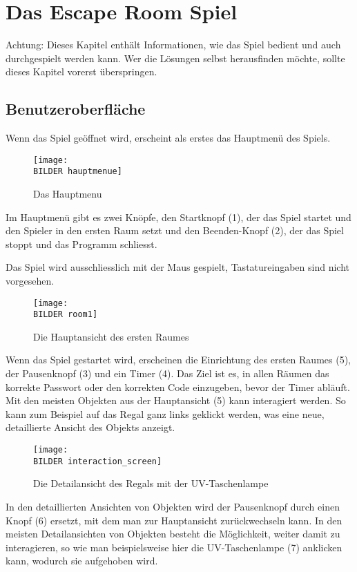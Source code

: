 \section{Das Escape Room Spiel}

Achtung: Dieses Kapitel enthält Informationen, wie das Spiel bedient und auch durchgespielt werden kann. Wer die Lösungen selbst herausfinden möchte, sollte dieses Kapitel vorerst überspringen.

\subsection{Benutzeroberfläche}
Wenn das Spiel geöffnet wird, erscheint als erstes das Hauptmenü des Spiels.

\begin{figure}[htb]
	\centering
		\texttt{[image: \\BILDER hauptmenue]}
 	\caption{Das Hauptmenu}
  \label{fig:hauptmenu}
\end{figure}

 
Im Hauptmenü gibt es zwei Knöpfe, den Startknopf (1), der das Spiel startet und den Spieler in den ersten Raum setzt und den Beenden-Knopf (2), der das Spiel stoppt und das Programm schliesst.

Das Spiel wird ausschliesslich mit der Maus gespielt, Tastatureingaben sind nicht vorgesehen. \newpage

\begin{figure}[h!]
	\centering
		\texttt{[image: \\BILDER room1]}
 	\caption{Die Hauptansicht des ersten Raumes}
  \label{fig:hauptansicht}
\end{figure}

Wenn das Spiel gestartet wird, erscheinen die Einrichtung des ersten Raumes (5), der Pausenknopf (3) und ein Timer (4). Das Ziel ist es, in allen Räumen das korrekte Passwort oder den korrekten Code einzugeben, bevor der Timer abläuft. Mit den meisten Objekten aus der Hauptansicht (5) kann interagiert werden. So kann zum Beispiel auf das Regal ganz links geklickt werden, was eine neue, detaillierte Ansicht des Objekts anzeigt.

\begin{figure}[h!]
	\centering
		\texttt{[image: \\BILDER interaction\_screen]}
 	\caption{Die Detailansicht des Regals mit der UV-Taschenlampe}
  \label{fig:detailansicht}
\end{figure}

In den detaillierten Ansichten von Objekten wird der Pausenknopf durch einen Knopf (6) ersetzt, mit dem man zur Hauptansicht zurückwechseln kann. In den meisten Detailansichten von Objekten besteht die Möglichkeit, weiter damit zu interagieren, so wie man beispielsweise hier die UV-Taschenlampe (7) anklicken kann, wodurch sie aufgehoben wird.

